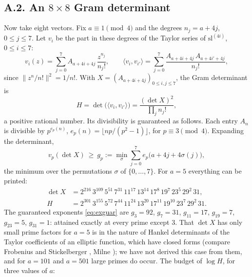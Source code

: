 \documentclass[11pt]{amsart}
\numberwithin{equation}{section}
\theoremstyle{definition}
\theoremstyle{remark}
\renewcommand{\sl}{\mathrm{sl}}
\begin{document}
\subsection*{A.2. An $8\times8$ Gram determinant}
Now take eight vectors. Fix $a\equiv1\pmod4$ and the degrees $n_j=a+4j$, $0\le j\le7$. Let $v_i$ be the part in these degrees of the Taylor series of $\sl^{(4i)}$, $0\le i\le7$:
\begin{equation}\label{eq:exvec}
 v_i(z)=\sum_{j=0}^7A_{a+4i+4j}\,\frac{z^{n_j}}{n_j!},\qquad\langle v_i,v_{i'}\rangle=\sum_{j=0}^7\frac{A_{a+4i+4j}\,A_{a+4i'+4j}}{n_j!},
\end{equation}
since $\|z^n/n!\|^2=1/n!$. With $X=(A_{a+4i+4j})_{0\le i,j\le7}$, the Gram determinant is
\begin{equation}\label{eq:exH}
 H=\det\bigl(\langle v_i,v_{i'}\rangle\bigr)=\frac{(\det X)^2}{\prod_jn_j!},
\end{equation}
a positive rational number. Its divisibility is guaranteed as follows. Each entry $A_n$ is divisible by $p^{e_p(n)}$, $e_p(n)=\lfloor np/(p^2-1)\rfloor$, for $p\equiv3\pmod4$. Expanding the determinant,
\begin{equation}\label{eq:exguar}
 v_p(\det X)\ \ge\ g_p:=\min_{\sigma}\sum_{j=0}^7e_p\bigl(a+4j+4\sigma(j)\bigr),
\end{equation}
the minimum over the permutations $\sigma$ of $\{0,\dots,7\}$. For $a=5$ everything can be printed:
\begin{align}
 \det X&=2^{216}\,3^{109}\,5^{51}\,7^{31}\,11^{17}\,13^{14}\,17^{8}\,19^{7}\,23^{5}\,29^{2}\,31,\\
 H&=2^{301}\,3^{155}\,5^{72}\,7^{44}\,11^{24}\,13^{20}\,17^{11}\,19^{10}\,23^{7}\,29^{2}\,31 .
\end{align}
The guaranteed exponents \eqref{eq:exguar} are $g_3=92$, $g_7=31$, $g_{11}=17$, $g_{19}=7$, $g_{23}=5$, $g_{31}=1$: attained exactly at every prime except $3$. That $\det X$ has only small prime factors for $a=5$ is in the nature of Hankel determinants of the Taylor coefficients of an elliptic function, which have closed forms (compare Frobenius and Stickelberger \cite{FS}, Milne \cite{milne}); we have not derived this case from them, and for $a=101$ and $a=501$ large primes do occur. The budget of $\log H$, for three values of $a$:
\end{document}
